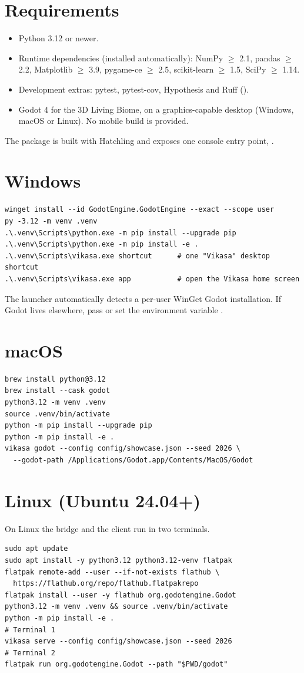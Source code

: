\section{Requirements}
\begin{itemize}[leftmargin=*]
\item Python 3.12 or newer.
\item Runtime dependencies (installed automatically): NumPy $\ge$ 2.1, pandas
$\ge$ 2.2, Matplotlib $\ge$ 3.9, pygame-ce $\ge$ 2.5, scikit-learn $\ge$ 1.5, SciPy $\ge$ 1.14.
\item Development extras: pytest, pytest-cov, Hypothesis and Ruff
().
\item Godot 4 for the 3D Living Biome, on a graphics-capable desktop
(Windows, macOS or Linux). No mobile build is provided.
\end{itemize}
The package is built with Hatchling and exposes one console entry point,
.

\section{Windows}
\begin{lstlisting}
winget install --id GodotEngine.GodotEngine --exact --scope user
py -3.12 -m venv .venv
.\.venv\Scripts\python.exe -m pip install --upgrade pip
.\.venv\Scripts\python.exe -m pip install -e .
.\.venv\Scripts\vikasa.exe shortcut      # one "Vikasa" desktop shortcut
.\.venv\Scripts\vikasa.exe app           # open the Vikasa home screen
\end{lstlisting}
The launcher automatically detects a per-user WinGet Godot installation. If Godot
lives elsewhere, pass  or set the environment variable
.

\section{macOS}
\begin{lstlisting}
brew install python@3.12
brew install --cask godot
python3.12 -m venv .venv
source .venv/bin/activate
python -m pip install --upgrade pip
python -m pip install -e .
vikasa godot --config config/showcase.json --seed 2026 \
  --godot-path /Applications/Godot.app/Contents/MacOS/Godot
\end{lstlisting}

\section{Linux (Ubuntu 24.04+)}
On Linux the bridge and the client run in two terminals.
\begin{lstlisting}
sudo apt update
sudo apt install -y python3.12 python3.12-venv flatpak
flatpak remote-add --user --if-not-exists flathub \
  https://flathub.org/repo/flathub.flatpakrepo
flatpak install --user -y flathub org.godotengine.Godot
python3.12 -m venv .venv && source .venv/bin/activate
python -m pip install -e .
# Terminal 1
vikasa serve --config config/showcase.json --seed 2026
# Terminal 2
flatpak run org.godotengine.Godot --path "$PWD/godot"
\end{lstlisting}

